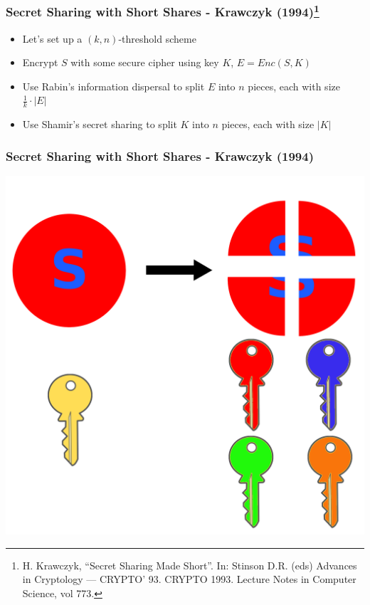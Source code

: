 \documentclass{beamer}
\begin{document}
\begin{frame}
	\frametitle{Secret Sharing with Short Shares - Krawczyk (1994)\footnote{H. Krawczyk, ``Secret Sharing Made Short''. In: Stinson D.R. (eds) Advances in Cryptology — CRYPTO’ 93. CRYPTO 1993. Lecture Notes in Computer Science, vol 773.}}
	\begin{itemize}
		\item Let's set up a $(k,n)$-threshold scheme\pause
		\item Encrypt $S$ with some secure cipher using key $K$, $E = Enc(S,K)$\pause
		\item Use Rabin's information dispersal to split $E$ into $n$ pieces, each with size $\frac{1}{k}\cdot |E|$\pause
		\item Use Shamir's secret sharing to split $K$ into $n$ pieces, each with size $|K|$
	\end{itemize}
\end{frame}

\begin{frame}
	\frametitle{Secret Sharing with Short Shares - Krawczyk (1994)}
	\centering
	\includegraphics[scale=.1]{secret_split.png}
\end{frame}
\end{document}
